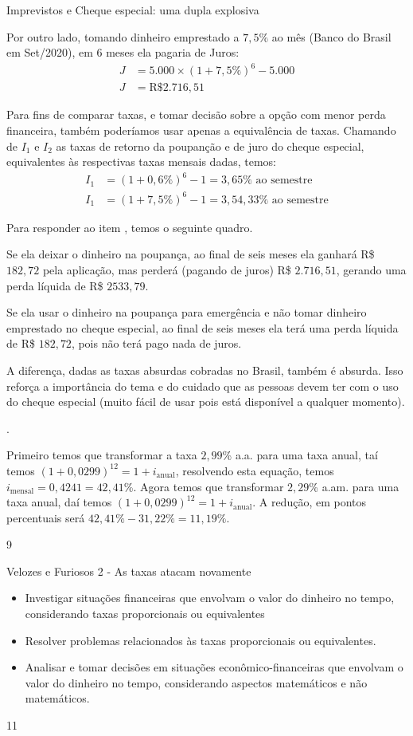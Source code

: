 \begin{answer}{Imprevistos e Cheque especial: uma dupla explosiva}
{\begin{enumerate}
Por outro lado, tomando dinheiro emprestado a $7{,}5\%$ ao mês (Banco do Brasil em Set/2020), em 6 meses ela pagaria de Juros:
\begin{align*}
J&=5.000\times(1+7{,}5\%)^6-5.000\\
J&=\text{R\$ }2.716{,}51
\end{align*}

Para fins de comparar taxas, e tomar decisão sobre a opção com menor perda financeira, também poderíamos usar apenas a equivalência de taxas. Chamando de $I_1$ e $I_2$ as taxas de retorno da poupanção e de juro do cheque especial, equivalentes às respectivas taxas mensais dadas, temos:
\begin{align*}
I_1&=(1+0{,}6\%)^6-1=3{,}65\%\text{ ao semestre}\\
I_1&=(1+7{,}5\%)^6-1=3{,}54{,}33\%\text{ ao semestre}
\end{align*}

Para responder ao item , temos o seguinte quadro.

Se ela deixar o dinheiro na poupança, ao final de seis meses ela ganhará R\$ $182{,}72$ pela aplicação, mas perderá (pagando de juros) R\$ $2.716{,}51$, gerando uma perda líquida de R\$ $2533{,}79$.

Se ela usar o dinheiro na poupança para emergência e não tomar dinheiro emprestado no cheque especial, ao final de seis meses ela terá uma perda líquida de R\$ $182{,}72$, pois não terá pago nada de juros.

A diferença, dadas as taxas absurdas cobradas no Brasil, também é absurda. Isso reforça a importância do tema e do cuidado que as pessoas devem ter com o uso do cheque especial (muito fácil de usar pois está disponível a qualquer momento).
\end{enumerate}.


Primeiro temos que transformar a taxa $2{,}99$\% a.a. para uma taxa anual, taí temos $(1+0{,}0299)^{12}=1+i_{\text{anual}}$, resolvendo esta equação, temos $i_{\text{mensal}}=0{,}4241=42{,}41$\%. Agora temos que transformar $2{,}29$\% a.am. para uma taxa anual, daí temos $(1+0{,}0299)^{12}=1+i_{\text{anual}}$. A redução, em pontos percentuais será $42{,}41\%-31{,}22\%=11{,}19\%$. 

}{9}
\end{answer}
\begin{objectives}{Velozes e Furiosos 2 - As taxas atacam novamente}
{
\begin{itemize}
\item Investigar situações financeiras que envolvam o valor do dinheiro no tempo, considerando taxas proporcionais ou equivalentes
\item Resolver problemas relacionados às taxas proporcionais ou equivalentes.
\item Analisar e tomar decisões em situações econômico-financeiras que envolvam o valor do dinheiro no tempo, considerando aspectos matemáticos e não matemáticos.
\end{itemize}
}{1}{1}
\end{objectives}

